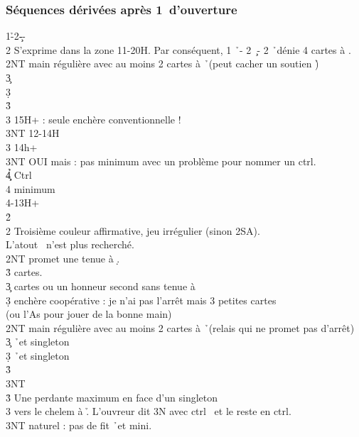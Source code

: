 \documentclass[a4paper]{article}
\begin{document}
\subsubsection{Séquences dérivées après 1\pdfh\ d’ouverture}

\begin{bidtable}
1\h-2\c--\+\\
2\s \> S’exprime dans la zone 11-20H. Par conséquent, 1 \h\ - 2 \c\ - 2 \h\ dénie 4 cartes à \s .\+\\
2NT \> main régulière avec au moins 2 cartes à \h\ (peut cacher un soutien \h )\+\\
3\c {}\\
3\d {}\\
3\h {}\\
3\s {} 15H+ : seule enchère conventionnelle !\\
3NT  12-14H\-\\
3\s \> 14h+\+\\
3NT \> OUI mais : pas minimum avec un problème pour nommer un ctrl.\\
4\c\d\h \> Ctrl\\
4\s \> minimum\-\\
4\s {}-13H+\-\\
2\h\+\\
2\s \> Troisième couleur affirmative, jeu irrégulier (sinon 2SA).\\
\>L’atout \s\ n’est plus recherché.\+\\
2NT \> promet une tenue à \d .\\
3\h {} cartes.\\
3\c {} cartes ou un honneur second sans tenue à \d \\
3\d \> enchère coopérative : je n’ai pas l’arrêt mais 3 petites cartes\\
\>(ou l’As pour jouer de la bonne main)\-\\
2NT \> main régulière avec au moins 2 cartes à \h\ (relais qui ne promet pas d'arrêt)\+\\
3\c {} \h\ et singleton \c \\
3\d {} \h\ et singleton \d \\
3\h {}\\
3NT \-\-\\
3\h \> Une perdante maximum en face d'un singleton\+\\
3\s \> vers le chelem à \h . L'ouvreur dit 3N avec ctrl \s\ et le reste en ctrl.\\
3NT \> naturel : pas de fit \h\ et mini.\\

\end{bidtable}
\end{document}
